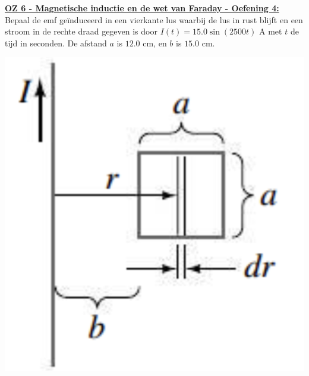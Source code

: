 \textbf{\underline{OZ 6 - Magnetische inductie en de wet van Faraday - Oefening 4:}}
\vspace{0.5cm}
    Bepaal de emf geïnduceerd in een vierkante lus waarbij de lus in rust blijft en een stroom in de rechte draad gegeven is door $I(t) = 15.0\sin(2500t)$ A met $t$ de tijd in seconden. De afstand $a$ is $12.0$ cm, en $b$ is $15.0$ cm.

    \begin{center}
        \includegraphics[scale = 0.18]{oz06/resources/Oz6Oef4.png}
    \end{center}

    \begin{description}[labelwidth=1.5cm, leftmargin=!]
        \item[Geg. :]
        \item[Gevr. :] 
        \item[Opl. :]
    \end{description}


\vspace{1cm}